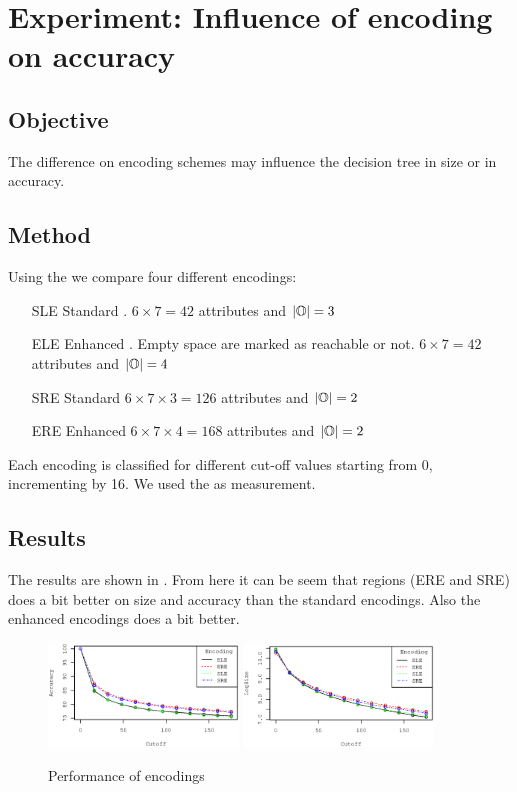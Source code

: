 \section{Experiment: Influence of encoding on accuracy}
\subsection{Objective}
The difference on encoding schemes may influence the decision tree in size or in accuracy.
\subsection{Method}
Using the  we compare four different encodings:
\begin{enumerate}
	\item [SLE] Standard .  $6 \times 7 = 42$ attributes and $|\mathbb{O}| = 3$ 
	\item [ELE] Enhanced . Empty space are marked as reachable or not. $6 \times 7 = 42$ attributes and $|\mathbb{O}| = 4$  
	\item [SRE] Standard  $6 \times 7 \times 3 = 126$ attributes and $|\mathbb{O}| = 2$
	\item [ERE] Enhanced  $6 \times 7 \times 4 = 168$ attributes and $|\mathbb{O}| = 2$
\end{enumerate}
Each encoding is classified for different cut-off values starting from 0, incrementing by 16. We used the  as measurement.

\subsection{Results}
The results are shown in .  From here it can be seem that regions (ERE and SRE) does a bit better on size and accuracy than the standard encodings. Also the enhanced encodings does a bit better.  
\begin{figure} 
\centering
\subfigure %
{
	\includegraphics[width=0.45\textwidth]{artifacts/c4-028acc.eps}
}
\qquad
\subfigure %
{
	\includegraphics[width=0.45\textwidth]{artifacts/c4-028size.eps}
}
\caption{Performance of encodings}
\label{fig:c4-028}
\end{figure}
